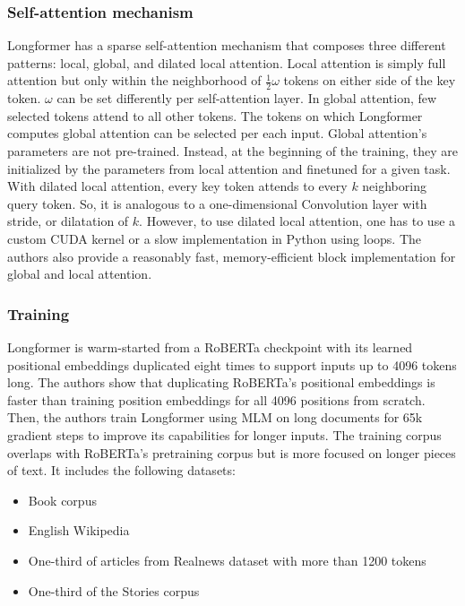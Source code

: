 \subsubsection{Self-attention mechanism}

Longformer has a sparse self-attention mechanism that composes three different
patterns: local, global, and dilated local attention. Local attention is simply
full attention but only within the neighborhood of $\frac{1}{2}\omega$ tokens
on either side of the key token. $\omega$ can be set differently per
self-attention layer. In global attention, few selected tokens attend to all
other tokens. The tokens on which Longformer computes global attention can be
selected per each input. Global attention's parameters are not pre-trained.
Instead, at the beginning of the training, they are initialized by the
parameters from local attention and finetuned for a given task. With dilated
local attention, every key token attends to every $k$ neighboring query token.
So, it is analogous to a one-dimensional Convolution layer
\citep{van2016wavenet} with stride, or dilatation of $k$. However, to use
dilated local attention, one has to use a custom CUDA kernel or a slow
implementation in Python using loops. The authors also provide a reasonably
fast, memory-efficient block implementation for global and local
attention.

\subsubsection{Training}

Longformer is warm-started from a RoBERTa \citep{liu2019roberta} checkpoint
with its learned positional embeddings duplicated eight times to support inputs
up to 4096 tokens long. The authors show that duplicating RoBERTa's positional
embeddings is faster than training position embeddings for all 4096 positions
from scratch. Then, the authors train Longformer using MLM on long documents
for 65k gradient steps to improve its capabilities for longer inputs. The
training corpus overlaps with RoBERTa's pretraining corpus but is more focused
on longer pieces of text. It includes the following datasets:

\begin{itemize}

  \item Book corpus \citep{zhu2015aligning}

  \item English Wikipedia

  \item One-third of articles from Realnews dataset \citep{zellers2019defending}
      with more than 1200 tokens

  \item One-third of the Stories corpus \citep{trinh2018simple}

\end{itemize}

